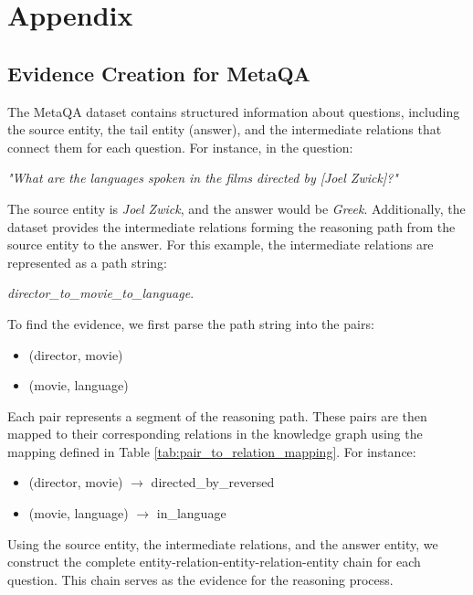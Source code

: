 \documentclass[11pt]{article}
\begin{document}
\appendix

\section{Appendix}\label{sec:appendix}
\subsection{Evidence Creation for MetaQA}\label{sec:evidence_creation}
The MetaQA dataset contains structured information about questions, including the source entity, the tail entity (answer), and the intermediate relations that connect them for each question. For instance, in the question:
\begin{center} \textit{"What are the languages spoken in the films directed by [Joel Zwick]?"} \end{center}
The source entity is \textit{Joel Zwick}, and the answer would be \textit{Greek}. Additionally, the dataset provides the intermediate relations forming the reasoning path from the source entity to the answer. For this example, the intermediate relations are represented as a path string:
\begin{center} 
\textit{director\_to\_movie\_to\_language}. 
\end{center}
To find the evidence, we first parse the path string into the pairs:
\begin{itemize}
    \item (director, movie)
    \item (movie, language)
\end{itemize}
Each pair represents a segment of the reasoning path. These pairs are then mapped to their corresponding relations in the knowledge graph using the mapping defined in Table \ref{tab:pair_to_relation_mapping}. For instance:
\begin{itemize}
    \item (director, movie) $\rightarrow$ directed\_by\_reversed
    \item (movie, language) $\rightarrow$ in\_language
\end{itemize}

Using the source entity, the intermediate relations, and the answer entity, we construct the complete entity-relation-entity-relation-entity chain for each question. This chain serves as the evidence for the reasoning process.
\end{document}
